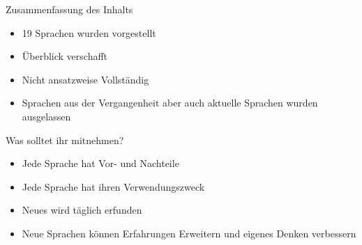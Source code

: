 \newSectionPage{\insertsectionhead}


\begin{frame}{Zusammenfassung des Inhalts}

    \begin{itemize}
        \item 19 Sprachen wurden vorgestellt
        \item Überblick verschafft
        \item Nicht ansatzweise Vollständig
        \item Sprachen aus der Vergangenheit aber auch aktuelle Sprachen wurden ausgelassen
    \end{itemize}


\end{frame}

\begin{frame}{Was solltet ihr mitnehmen?}

    \begin{itemize}
        \item Jede Sprache hat Vor- und Nachteile
        \item Jede Sprache hat ihren Verwendungszweck
        \item Neues wird täglich erfunden
        \item Neue Sprachen können Erfahrungen Erweitern und eigenes Denken verbessern
    \end{itemize}

    \note{

    }

\end{frame}

